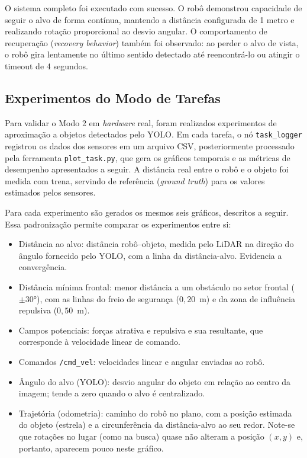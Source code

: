 O sistema completo foi executado com sucesso. O robô
demonstrou capacidade de seguir o alvo de forma contínua, mantendo a distância
configurada de 1 metro e realizando rotação proporcional ao desvio angular. O
comportamento de recuperação (\textit{recovery behavior}) também foi observado:
ao perder o alvo de vista, o robô gira lentamente no último sentido detectado
até reencontrá-lo ou atingir o timeout de 4 segundos.

\subsection{Experimentos do Modo de Tarefas}

Para validar o Modo 2 em \textit{hardware} real, foram realizados experimentos de
aproximação a objetos detectados pelo YOLO. Em cada tarefa, o nó
\texttt{task\_logger} registrou os dados dos sensores em um arquivo CSV,
posteriormente processado pela ferramenta \texttt{plot\_task.py}, que gera os
gráficos temporais e as métricas de desempenho apresentados a seguir. A distância
real entre o robô e o objeto foi medida com trena, servindo de referência
(\textit{ground truth}) para os valores estimados pelos sensores.

Para cada experimento são gerados os mesmos seis gráficos, descritos a seguir.
Essa padronização permite comparar os experimentos entre si:

\begin{itemize}
  \item Distância ao alvo: distância robô--objeto, medida pelo LiDAR na
  direção do ângulo fornecido pelo YOLO, com a linha da distância-alvo. Evidencia
  a convergência.
  \item Distância mínima frontal: menor distância a um obstáculo no setor
  frontal ($\pm30°$), com as linhas do freio de segurança ($0{,}20$~m) e da zona
  de influência repulsiva ($0{,}50$~m).
  \item Campos potenciais: forças atrativa e repulsiva e sua resultante,
  que corresponde à velocidade linear de comando.
  \item Comandos \texttt{/cmd\_vel}: velocidades linear e angular
  enviadas ao robô.
  \item Ângulo do alvo (YOLO): desvio angular do objeto em relação ao
  centro da imagem; tende a zero quando o alvo é centralizado.
  \item Trajetória (odometria): caminho do robô no plano, com a posição
  estimada do objeto (estrela) e a circunferência da distância-alvo ao seu redor.
  Note-se que rotações no lugar (como na busca) quase não alteram a posição
  $(x,y)$ e, portanto, aparecem pouco neste gráfico.
\end{itemize}

